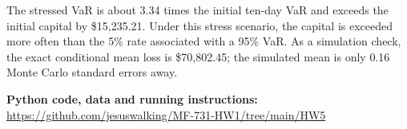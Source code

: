 \documentclass[10pt,letterpaper]{article}
\begin{document}
The stressed VaR is about 3.34 times the initial ten-day VaR and exceeds
the initial capital by \$15,235.21. Under this stress scenario, the capital
is exceeded more often than the 5\% rate associated with a 95\% VaR.
As a simulation check, the exact conditional mean loss is \$70,802.45;
the simulated mean is only 0.16 Monte Carlo standard errors away.

\vfill
\textbf{Python code, data and running instructions:}\\
\url{https://github.com/jesuswalking/MF-731-HW1/tree/main/HW5}
\end{document}
